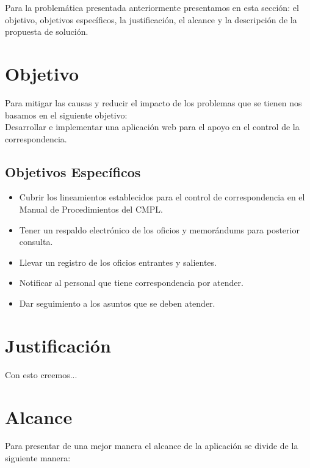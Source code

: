 
Para la problemática presentada anteriormente presentamos en esta sección: el objetivo, objetivos específicos, la justificación, el alcance y la descripción de la propuesta de solución.\\

\section{Objetivo}

Para mitigar las causas y reducir el impacto de los problemas que se tienen nos basamos en el siguiente objetivo: \\

Desarrollar e implementar una aplicación web para el apoyo en el control de la correspondencia.\\

\subsection{Objetivos Específicos}

\begin{itemize}
	\item Cubrir los lineamientos establecidos para el control de correspondencia en el Manual de Procedimientos del CMPL.
	\item Tener un respaldo electrónico de los oficios y memorándums para posterior consulta.
	\item Llevar un registro de los oficios entrantes y salientes.
	\item Notificar al personal que tiene correspondencia por atender.
	\item Dar seguimiento a los asuntos que se deben atender.
\end{itemize}

\section{Justificación}
Con esto creemos...

\section{Alcance}

Para presentar de una mejor manera el alcance de la aplicación se divide de la siguiente manera: \\

